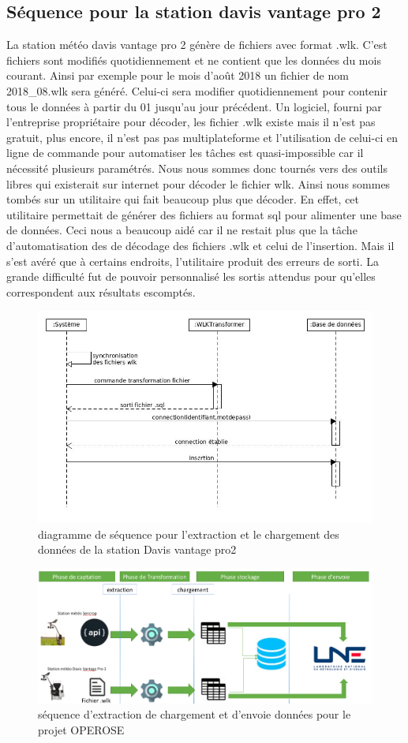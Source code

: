 \subsection{Séquence pour la station davis vantage pro 2} 
La station météo davis vantage pro 2 génère de fichiers avec format .wlk. C’est fichiers sont modifiés quotidiennement et ne contient que les données du mois courant. Ainsi par exemple pour le mois d’août 2018 un fichier de nom 2018\_08.wlk sera généré. Celui-ci sera modifier quotidiennement pour contenir tous le données à partir du 01 jusqu’au jour précédent. Un logiciel, fourni par l’entreprise propriétaire pour décoder, les fichier .wlk existe mais il n’est pas gratuit, plus encore, il n’est pas pas multiplateforme et l’utilisation de celui-ci en ligne de commande pour automatiser les tâches est quasi-impossible car il nécessité plusieurs paramétrés. Nous nous sommes donc tournés vers des outils libres qui existerait sur internet pour décoder le fichier wlk.  Ainsi nous sommes tombés sur un utilitaire qui fait beaucoup plus que décoder. En effet, cet utilitaire permettait de générer des fichiers au format sql pour alimenter une base de données. Ceci nous a beaucoup aidé car il ne restait plus que la tâche d'automatisation des  de décodage des fichiers .wlk et celui de l’insertion. Mais il s’est avéré que à certains endroits, l’utilitaire produit des erreurs de sorti. La grande difficulté fut de pouvoir personnalisé les sortis attendus pour qu’elles correspondent aux résultats escomptés. 

\begin{figure}
    \centering
     \includegraphics[width=.7\textwidth]{images/davis_senquence_diagrame.jpg}
     \caption{diagramme de séquence pour l'extraction et le chargement des données de la station Davis vantage pro2}
\end{figure}


\begin{figure}[!h]
    \centering
     \includegraphics[width=1\textwidth]{images/processusOperose.png}
     \caption{séquence d'extraction de chargement et d'envoie données pour le projet OPEROSE}
\end{figure}
     

